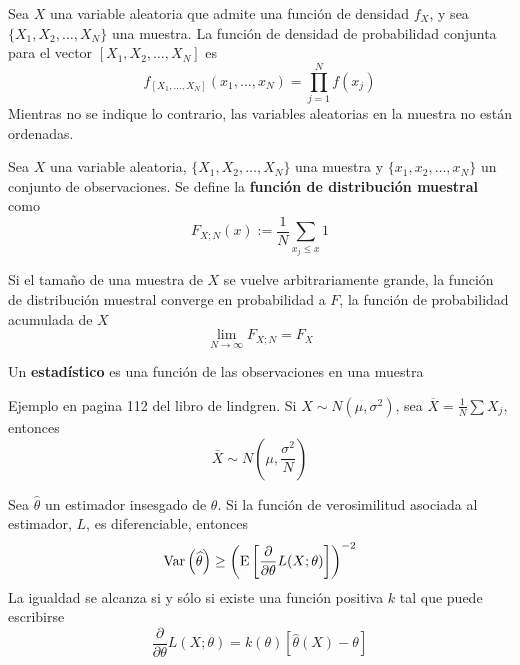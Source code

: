 \begin{proposicion}
Sea $X$ una variable aleatoria que admite una función de densidad $f_X$, y sea $\{ X_1, X_2, \dots, X_N \}$ una muestra. La función de densidad de probabilidad conjunta para el vector $[ X_1, X_2, \dots, X_N ]$ es
\begin{equation}
f_{[ X_1, \dots, X_N ]}(x_1, \dots, x_N ) = \prod_{j=1}^{N} f(x_j)
\end{equation}
Mientras no se indique lo contrario, las variables aleatorias en la muestra no están ordenadas.
\end{proposicion}

\begin{proposicion}
Sea $X$ una variable aleatoria, $\{ X_1, X_2, \dots, X_N \}$ una muestra y $\{ x_1, x_2, \dots, x_N \}$ un conjunto de observaciones. Se define la \textbf{función de distribución muestral} como
\begin{equation}
F_{X; N} (x) := \frac{1}{N} \sum_{x_j \leq x } 1
\end{equation}
\end{proposicion}

\begin{proposicion}
Si el tamaño de una muestra de $X$ se vuelve arbitrariamente grande, la función de distribución muestral converge en probabilidad a $F$, la función de probabilidad acumulada de $X$
\begin{equation}
\lim_{N \rightarrow \infty} F_{X; N} = F_X
\end{equation}
\end{proposicion}


\begin{definicion}
Un \textbf{estadístico} es una función de las observaciones en una muestra
\end{definicion}

Ejemplo en pagina 112 del libro de lindgren.
Si $X\sim N(\mu,\sigma^{2})$, sea $\overline{X} = \frac{1}{N} \sum X_j$, entonces
\begin{equation}
\overline{X} \sim N(\mu,\frac{\sigma^{2}}{N})
\end{equation}

\begin{teorema}
Sea $\widehat{\theta}$ un estimador insesgado de $\theta$. Si la función de verosimilitud asociada al estimador, $L$, es diferenciable, entonces
\begin{equation}
\mathrm{Var}\left( \widehat{\theta} \right) \geq \left( \mathrm{E}\left[ \frac{\partial}{\partial\theta} L(X; \theta) \right] \right)^{-2}
\end{equation}
La igualdad se alcanza si y sólo si existe una función positiva $k$ tal que puede escribirse
\begin{equation}
\frac{\partial}{\partial\theta} L(X; \theta) = k(\theta) \left[ \widehat{\theta}(X) - \theta \right] 
\end{equation}
\end{teorema}


